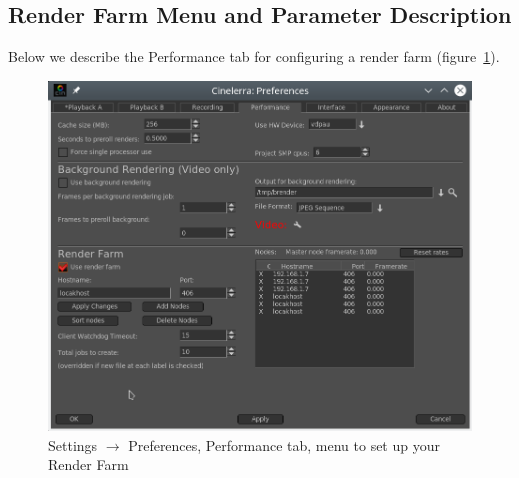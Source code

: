 \subsection{Render Farm Menu and Parameter Description}%
\label{sub:render_farm_parameter_description}

Below we describe the Performance tab for configuring a render farm (figure~\ref{fig:farm}).

\begin{figure}[htpb]
    \centering
    \includegraphics[width=0.8\linewidth]{images/farm.png}
    \caption{Settings $\rightarrow$ Preferences, Performance tab, menu to set up your Render Farm}
    \label{fig:farm}
\end{figure}

